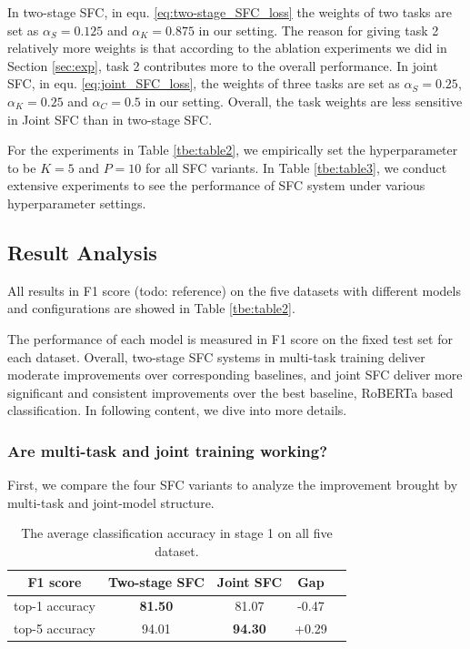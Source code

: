 \documentclass[letterpaper]{article} %
\providecommand{\tabularnewline}{\\}
\begin{document}
  In two-stage SFC, in equ. \ref{eq:two-stage_SFC_loss} the weights of two tasks
  are  set  as  $\alpha_S=0.125$ and $\alpha_K=0.875$ in our setting. The reason
  for  giving  task  2 relatively more weights is that according to the ablation
  experiments  we  did  in Section \ref{sec:exp}, task 2 contributes more to the
  overall  performance.  In  joint  SFC,  in  equ.  \ref{eq:joint_SFC_loss}, the
  weights  of  three  tasks  are  set  as  $\alpha_S=0.25$,  $\alpha_K=0.25$ and
  $\alpha_C=0.5$  in  our setting. Overall, the task weights are less sensitive
  in Joint SFC than in two-stage SFC.

  For  the  experiments  in  Table  \ref{tbe:table2},  we  empirically  set  the
  hyperparameter  to  be  $K=5$  and  $P=10$  for  all  SFC  variants.  In Table
  \ref{tbe:table3},  we  conduct extensive experiments to see the performance of
  SFC system under various hyperparameter settings.

  \subsection{Result Analysis}
  All results in F1 score (todo: reference) on the five datasets with different models and configurations are
  showed in Table  \ref{tbe:table2}.

  The performance of each model is measured in F1 score on the fixed
  test  set  for  each  dataset.  
  Overall,  two-stage  SFC systems in multi-task training deliver  moderate 
  improvements  over  corresponding baselines, and joint SFC deliver more
  significant and consistent improvements over the best baseline, RoBERTa based
  classification. In following content, we dive into more details.

  \subsubsection*{Are multi-task and joint training working?} 
  First, we compare the four  SFC  variants to analyze the improvement
  brought  by  multi-task  and  joint-model  structure. 

  \begin{table}
    \begin{centering}
      \begin{tabular}{|c|c|c|c|c|}
        \hline
        F1 score & Two-stage SFC & Joint SFC & Gap & \tabularnewline
        \hline
        top-1 accuracy  & \textbf{81.50} & 81.07 & -0.47 & \tabularnewline
        top-5 accuracy & 94.01 & \textbf{94.30} & +0.29 & \tabularnewline
        \hline
      \end{tabular}
      \par
    \end{centering}
    \caption{The average classification accuracy in stage 1 on all five dataset.}
    \label{tbe:top1_5_accuracy}
  \end{table}
\end{document}
